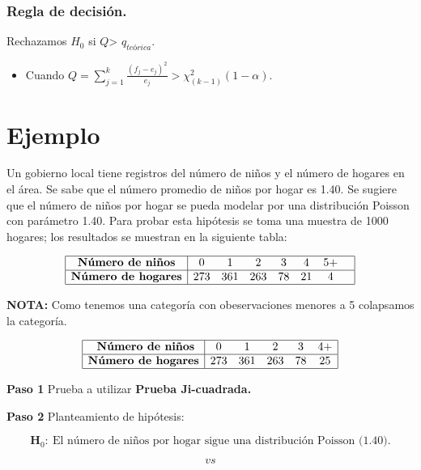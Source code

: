 \documentclass[
  a4paper,
  oneside,
  openany]{book}
\providecommand{\tightlist}{%
  \setlength{\itemsep}{0pt}\setlength{\parskip}{0pt}}
\begin{document}
\hypertarget{regla-de-decisiuxf3n.}{%
\subsubsection*{Regla de decisión.}\label{regla-de-decisiuxf3n.}}


Rechazamos \(H_0\) si \(Q\)\textgreater{} \(q_{teórica}.\)

\begin{itemize}
\tightlist
\item
  Cuando \(Q= \sum_{j=1}^{k}\frac{(f_{j}-e_{j})^2}{e_{j}} > \chi^2_{(k-1)}(1-\alpha).\)
\end{itemize}

\hypertarget{ejemplo-11}{%
\section{Ejemplo}\label{ejemplo-11}}

Un gobierno local tiene registros del número de niños y el número de hogares en el área. Se sabe que el número promedio de niños por hogar es 1.40. Se sugiere que el número de niños por hogar se pueda modelar por una distribución Poisson con parámetro 1.40.
Para probar esta hipótesis se toma una muestra de 1000 hogares; los resultados se muestran en la siguiente tabla:

\[
\begin{array}{|c |c c c c c c c|}
\hline
\textbf{Número de niños} &0 &1 &2& 3&4 &5+& \\
\hline
\textbf{Número de hogares} & 273& 361&263 &78 & 21 & 4& \\
\hline
\end{array}
\]

\textbf{NOTA:} Como tenemos una categoría con obeservaciones menores a 5 colapsamos la categoría.

\[
\begin{array}{|c |c c c c c|}
\hline
\textbf{  Número de niños} &0 &1 &2& 3&4+  \\
\hline
\textbf{Número de hogares} & 273& 361&263 &78 & 25  \\
\hline
\end{array}
\]

\textbf{Paso 1} Prueba a utilizar \textbf{Prueba Ji-cuadrada.}

\textbf{Paso 2} Planteamiento de hipótesis:

\[\textbf{H}_0: \ \mbox{El número de niños por hogar sigue una distribución Poisson (1.40).}\]

\[vs\]
\end{document}
